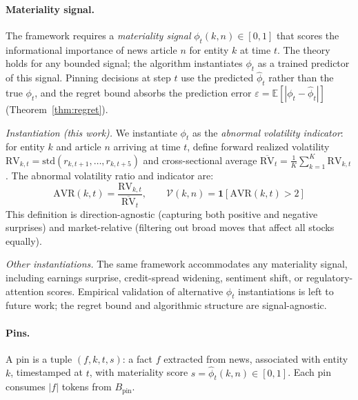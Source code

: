 \documentclass{article}
\newcommand{\voltarget}{\mathcal{V}}
\begin{document}
\paragraph{Materiality signal.}
The framework requires a \emph{materiality signal} $\phi_t(k, n) \in [0,1]$ that scores the informational importance of news article $n$ for entity $k$ at time $t$.
The theory holds for any bounded signal; the algorithm instantiates $\phi_t$ as a trained predictor of this signal.
Pinning decisions at step $t$ use the predicted $\hat{\phi}_t$ rather than the true $\phi_t$, and the regret bound absorbs the prediction error $\varepsilon = \mathbb{E}[|\phi_t - \hat{\phi}_t|]$ (Theorem~\ref{thm:regret}).

\emph{Instantiation (this work).}
We instantiate $\phi_t$ as the \emph{abnormal volatility indicator}: for entity $k$ and article $n$ arriving at time $t$, define forward realized volatility $\text{RV}_{k,t} = \text{std}(r_{k,t+1}, \ldots, r_{k,t+5})$ and cross-sectional average $\overline{\text{RV}}_t = \frac{1}{K}\sum_{k=1}^{K} \text{RV}_{k,t}$.
The abnormal volatility ratio and indicator are:
\begin{equation}
  \text{AVR}(k, t) = \frac{\text{RV}_{k,t}}{\overline{\text{RV}}_t}, \qquad
  \voltarget(k, n) = \mathbf{1}\!\left[\text{AVR}(k, t) > 2\right]
  \label{eq:voltarget}
\end{equation}
This definition is direction-agnostic (capturing both positive and negative surprises) and market-relative (filtering out broad moves that affect all stocks equally).

\emph{Other instantiations.}
The same framework accommodates any materiality signal, including earnings surprise, credit-spread widening, sentiment shift, or regulatory-attention scores.
Empirical validation of alternative $\phi_t$ instantiations is left to future work; the regret bound and algorithmic structure are signal-agnostic.

\paragraph{Pins.}
A pin is a tuple $(f, k, t, s)$: a fact $f$ extracted from news, associated with entity $k$, timestamped at $t$, with materiality score $s = \hat{\phi}_t(k, n) \in [0,1]$.
Each pin consumes $|f|$ tokens from $B_{\text{pin}}$.
\end{document}
